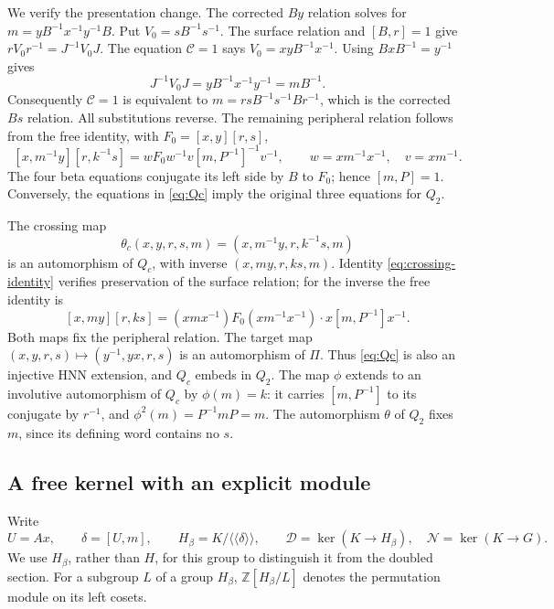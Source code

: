 \documentclass[11pt]{amsart}
\theoremstyle{definition}
\theoremstyle{remark}
\newcommand{\Z}{\mathbb Z}
\newcommand{\nc}[1]{\langle\!\langle #1\rangle\!\rangle}
\begin{document}
We verify the presentation change. The corrected $By$ relation solves
for $m=yB^{-1}x^{-1}y^{-1}B$. Put $V_0=sB^{-1}s^{-1}$.
The surface relation and $[B,r]=1$ give
$rV_0r^{-1}=J^{-1}V_0J$. The equation $\mathcal C=1$ says
$V_0=xyB^{-1}x^{-1}$. Using $BxB^{-1}=y^{-1}$ gives
\[
 J^{-1}V_0J=yB^{-1}x^{-1}y^{-1}=mB^{-1}.
\]
Consequently $\mathcal C=1$ is equivalent to
$m=rsB^{-1}s^{-1}Br^{-1}$, which is the corrected $Bs$ relation.
All substitutions reverse. The remaining peripheral relation follows
from the free identity, with $F_0=[x,y][r,s]$,
\begin{equation}\label{eq:crossing-identity}
 [x,m^{-1}y][r,k^{-1}s]
  =wF_0w^{-1}v[m,P^{-1}]^{-1}v^{-1},
 \qquad w=xm^{-1}x^{-1},\quad v=xm^{-1}.
\end{equation}
The four beta equations conjugate its left side by $B$ to $F_0$;
hence $[m,P]=1$. Conversely, the equations in \eqref{eq:Qc}
imply the original three equations for $Q_2$.

The crossing map
\[
 \theta_c(x,y,r,s,m)=(x,m^{-1}y,r,k^{-1}s,m)
\]
is an automorphism of $Q_c$, with inverse
$(x,my,r,ks,m)$. Identity \eqref{eq:crossing-identity} verifies
preservation of the surface relation; for the inverse the free identity is
\[
 [x,my][r,ks]=(xmx^{-1})F_0(xm^{-1}x^{-1})
                   \cdot x[m,P^{-1}]x^{-1}.
\]
Both maps fix the peripheral relation.
The target map $(x,y,r,s)\mapsto(y^{-1},yx,r,s)$ is an automorphism
of $\Pi$. Thus \eqref{eq:Qc} is also an injective HNN extension,
and $Q_c$ embeds in $Q_2$.
The map $\phi$ extends to an involutive automorphism of $Q_c$ by
$\phi(m)=k$: it carries $[m,P^{-1}]$ to its conjugate by $r^{-1}$,
and $\phi^2(m)=P^{-1}mP=m$. The automorphism $\theta$ of $Q_2$
fixes $m$, since its defining word contains no $s$.

\subsection{A free kernel with an explicit module}
Write
\[
 U=Ax,\qquad \delta=[U,m],\qquad
 H_\beta=K/\nc\delta,\qquad
 \mathcal D=\ker(K\to H_\beta),\quad
 \mathcal N=\ker(K\to G).
\]
We use $H_\beta$, rather than $H$, for this group to distinguish it
from the doubled section. For a subgroup $L$ of a group $H_\beta$,
$\Z[H_\beta/L]$ denotes the permutation module on its left cosets.
\end{document}
